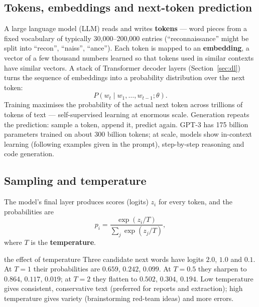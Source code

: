 \documentclass[11pt]{article}
\begin{document}
\subsection{Tokens, embeddings and next-token prediction}
A large language model (LLM) reads and writes \textbf{tokens} --- word pieces from a fixed vocabulary of typically 30,000--200,000 entries (``reconnaissance'' might be split into ``recon'', ``naiss'', ``ance''). Each token is mapped to an \textbf{embedding}, a vector of a few thousand numbers learned so that tokens used in similar contexts have similar vectors. A stack of Transformer decoder layers (Section~\ref{sec:dl}) turns the sequence of embeddings into a probability distribution over the next token:
\[P(w_t\mid w_1,\ldots,w_{t-1};\theta).\]
Training maximises the probability of the actual next token across trillions of tokens of text --- self-supervised learning at enormous scale. Generation repeats the prediction: sample a token, append it, predict again. GPT-3 has 175 billion parameters trained on about 300 billion tokens; at scale, models show in-context learning (following examples given in the prompt), step-by-step reasoning and code generation.

\subsection{Sampling and temperature}
The model's final layer produces scores (logits) $z_i$ for every token, and the probabilities are\[p_i=\frac{\exp(z_i/T)}{\sum_j\exp(z_j/T)},\]where $T$ is the \textbf{temperature}.
\begin{example}{the effect of temperature}
Three candidate next words have logits $2.0$, $1.0$ and $0.1$. At $T=1$ their probabilities are $0.659$, $0.242$, $0.099$. At $T=0.5$ they sharpen to $0.864$, $0.117$, $0.019$; at $T=2$ they flatten to $0.502$, $0.304$, $0.194$. Low temperature gives consistent, conservative text (preferred for reports and extraction); high temperature gives variety (brainstorming red-team ideas) and more errors.
\end{example}
\end{document}
